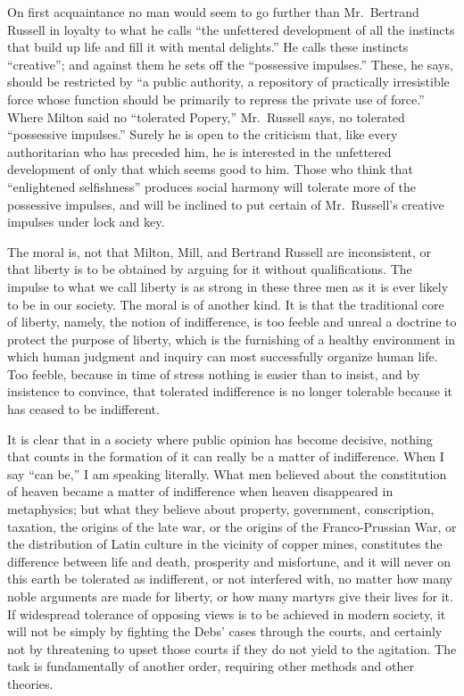 \documentclass[openany,nobib,twoside,nohyper]{tufte-book}
\begin{document}
On first acquaintance no man would seem to go further than Mr.~Bertrand
Russell in loyalty to what he calls ``the unfettered development of all
the instincts that build up life and fill it with mental delights.'' He
calls these instincts ``creative''; and against them he sets off the
``possessive impulses.'' These, he says, should be restricted by ``a
public authority, a repository of practically irresistible force whose
function should be primarily to repress the private use of force.''
Where Milton said no ``tolerated Popery,'' Mr.~Russell says, no
tolerated ``possessive impulses.'' Surely he is open to the criticism
that, like every authoritarian who has preceded him, he is interested in
the unfettered development of only that which seems good to him. Those
who think that ``enlightened selfishness'' produces social harmony will
tolerate more of the possessive impulses, and will be inclined to put
certain of Mr.~Russell's creative impulses under lock and key.

The moral is, not that Milton, Mill, and Bertrand Russell are
inconsistent, or that liberty is to be obtained by arguing for it
without qualifications. The impulse to what we call liberty is as strong
in these three men as it is ever likely to be in our society. The moral
is of another kind. It is that the traditional core of liberty, namely,
the notion of indifference, is too feeble and unreal a doctrine to
protect the purpose of liberty, which is the furnishing of a healthy
environment in which human judgment and inquiry can most successfully
organize human life. Too feeble, because in time of stress nothing is
easier than to insist, and by insistence to convince, that tolerated
indifference is no longer tolerable because it has ceased to be
indifferent.

It is clear that in a society where public opinion has become decisive,
nothing that counts in the formation of it can really be a matter of
indifference. When I say ``can be,'' I am speaking literally. What men
believed about the constitution of heaven became a matter of
indifference when heaven disappeared in metaphysics; but what they
believe about property, government, conscription, taxation, the origins
of the late war, or the origins of the Franco-Prussian War, or the
distribution of Latin culture in the vicinity of copper mines,
constitutes the difference between life and death, prosperity and
misfortune, and it will never on this earth be tolerated as indifferent,
or not interfered with, no matter how many noble arguments are made for
liberty, or how many martyrs give their lives for it. If widespread
tolerance of opposing views is to be achieved in modern society, it will
not be simply by fighting the Debs' cases through the courts, and
certainly not by threatening to upset those courts if they do not yield
to the agitation. The task is fundamentally of another order, requiring
other methods and other theories.
\end{document}
